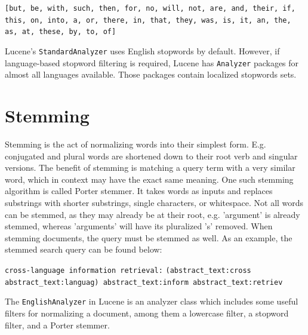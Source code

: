 \documentclass[parskip=full]{aaltoseries}
\providecommand{\inlinecode}[1]{\texttt{#1}}
\begin{document}
\inlinecode{[but, be, with, such, then, for, no, will, not, are, and, their, if, this, on, into, a, or, there, in, that, they, was, is, it, an, the, as, at, these, by, to, of]}

Lucene's \inlinecode{StandardAnalyzer} uses English stopwords by default. However, if language-based stopword filtering is required, Lucene has \inlinecode{Analyzer} packages for almost all languages available. Those packages contain localized stopwords sets.


\newpage
\section{Stemming}
Stemming is the act of normalizing words into their simplest form. E.g. conjugated and plural words are shortened down to their root verb and singular versions. The benefit of stemming is matching a query term with a very similar word, which in context may have the exact same meaning. One such stemming algorithm is called Porter stemmer. It takes words as inputs and replaces substrings with shorter substrings, single characters, or whitespace. Not all words can be stemmed, as they may already be at their root, e.g. 'argument' is already stemmed, whereas 'arguments' will have its pluralized 's' removed. When stemming documents, the query must be stemmed as well. As an example, the stemmed search query can be found below:

\inlinecode{cross-language information retrieval:} \newline
\inlinecode{(abstract\_text:cross abstract\_text:languag)
\newline abstract\_text:inform abstract\_text:retriev}

The \inlinecode{EnglishAnalyzer} in Lucene is an analyzer class which includes some useful filters for normalizing a document, among them a lowercase filter, a stopword filter, and a Porter stemmer.
\end{document}
